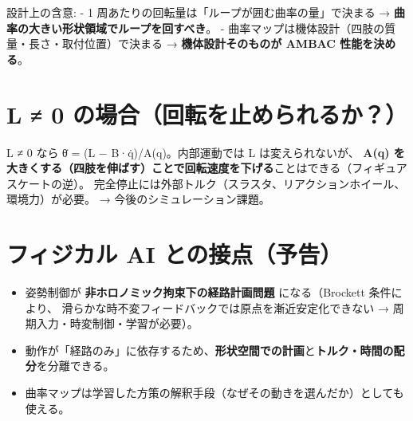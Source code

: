設計上の含意: - 1 周あたりの回転量は「ループが囲む曲率の量」で決まる → \textbf{曲率の大きい形状領域でループを回すべき}。 - 曲率マップは機体設計（四肢の質量・長さ・取付位置）で決まる → \textbf{機体設計そのものが AMBAC 性能を決める}。

\section{L ≠ 0 の場合（回転を止められるか？）}

L ≠ 0 なら θ̇ = (L − B·q̇)/A(q)。内部運動では L は変えられないが、 \textbf{A(q) を大きくする（四肢を伸ばす）ことで回転速度を下げる}ことはできる（フィギュアスケートの逆）。 完全停止には外部トルク（スラスタ、リアクションホイール、環境力）が必要。 → 今後のシミュレーション課題。

\section{フィジカル AI との接点（予告）}

\begin{itemize}
\tightlist
\item
  姿勢制御が \textbf{非ホロノミック拘束下の経路計画問題} になる（Brockett 条件により、 滑らかな時不変フィードバックでは原点を漸近安定化できない → 周期入力・時変制御・学習が必要）。
\item
  動作が「経路のみ」に依存するため、\textbf{形状空間での計画}と\textbf{トルク・時間の配分}を分離できる。
\item
  曲率マップは学習した方策の解釈手段（なぜその動きを選んだか）としても使える。
\end{itemize}
